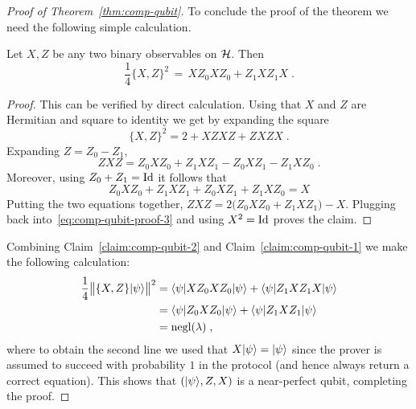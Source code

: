 \begin{proof}[Proof of Theorem~\ref{thm:comp-qubit}]
To conclude the proof of the theorem we need the following simple calculation. 

\begin{claim}\label{claim:comp-qubit-2}
Let $X,Z$ be any two binary observables on $\mathcal{H}$. Then 
\[ \frac{1}{4} \{X,Z\}^2 \,=\, X Z_0 X Z_0 + Z_1 X Z_1 X\;.\]
\end{claim}

\begin{proof}
This can be verified by direct calculation. Using that $X$ and $Z$ are Hermitian and square to identity we get by expanding the square
\begin{equation}\label{eq:comp-qubit-proof-3}
\{X,Z\}^2 = 2 + XZXZ + ZXZX\;.
\end{equation}
Expanding $Z = Z_0-Z_1$, 
\[ ZXZ = Z_0 X Z_0 + Z_1 X Z_1 - Z_0 X Z_1 - Z_1 X Z_0\;.\]
Moreover, using $Z_0+Z_1 = \mathop{\rm Id}\nolimits$ it follows that
\[ Z_0 X Z_0 + Z_1 X Z_1 + Z_0 X Z_1 + Z_1 X Z_0 = X\]
Putting the two equations together, $ZXZ = 2\big(Z_0 X Z_0 + Z_1 X Z_1\big) - X$. Plugging back into~\eqref{eq:comp-qubit-proof-3} and using $X^2=\mathop{\rm Id}\nolimits$ proves the claim. 
\end{proof}

Combining Claim~\ref{claim:comp-qubit-2} and Claim~\ref{claim:comp-qubit-1} we make the following calculation: 
\begin{align*}
\frac{1}{4}\big\|\{X,Z\}|\psi\rangle\big\|^2
&= \langle\psi| X Z_0 X Z_0 |\psi\rangle +\langle\psi| Z_1 X Z_1 X |\psi\rangle  \\ 
&= \langle\psi|  Z_0 X Z_0  |\psi\rangle + \langle\psi|  Z_1 X Z_1  |\psi\rangle \\ 
& = \operatorname{negl}(\lambda)\;,
\end{align*}
where to obtain the second line we used that $X|\psi\rangle=|\psi\rangle$ since the prover is assumed to succeed with probability $1$ in the protocol (and hence always return a correct equation). This shows that $(|\psi\rangle,Z,X)$ is a near-perfect qubit, completing the proof.
\end{proof}



